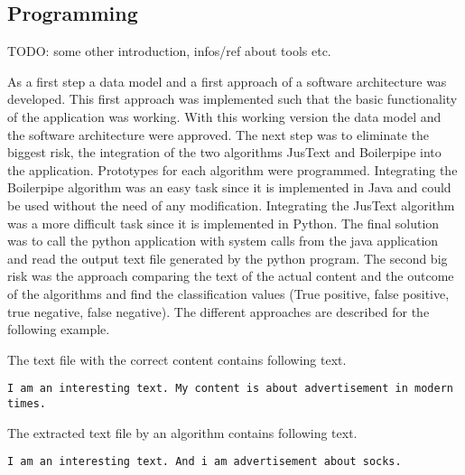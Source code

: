 \subsection{Programming}

TODO: some other introduction, infos/ref about tools etc.

As a first step a data model and a first approach of a software architecture was developed. This first approach was implemented such that the basic functionality of the application was working. With this working version the data model and the software architecture were approved. 
The next step was to eliminate the biggest risk, the integration of the two algorithms JusText and Boilerpipe into the application. Prototypes for each algorithm were programmed. Integrating the Boilerpipe algorithm \cite{algo:boilerpipe}  was an easy task since it is implemented in Java and could be used without the need of any modification. Integrating the JusText algorithm \cite{algo:justext} was a more difficult task since it is implemented in Python. The final solution was to call the python application with system calls from the java application and read the output text file generated by the python program. \linebreak
The second big risk was the approach comparing the text of the actual content and the outcome of the algorithms and find the classification values (True positive, false positive, true negative, false negative). The different approaches are described for the following example.


The text file with the correct content contains following text.


\texttt{I am an interesting text. My content is about advertisement in modern times.}

The extracted text file by an algorithm contains following text.

\texttt{I am an interesting text. And i am advertisement about socks. }

